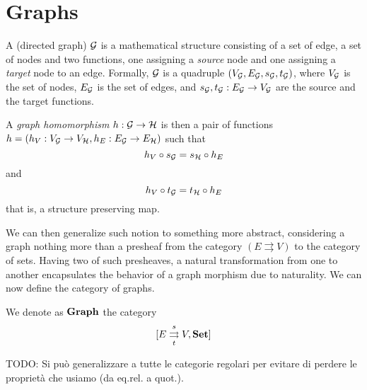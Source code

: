 \section{Graphs}\label{sect:graphs}

A (directed graph) $\mathcal{G}$ is a mathematical structure consisting of a set of edge, a set of nodes and two functions, one assigning a \emph{source} node and one assigning a \emph{target} node to an edge. Formally, $\mathcal{G}$ is a quadruple $(V_{\mathcal{G}}, E_{\mathcal{G}}, s_{\mathcal{G}}, t_{\mathcal{G}})$, where $V_{\mathcal{G}}$ is the set of nodes, $E_{\mathcal{G}}$ is the set of edges, and $s_{\mathcal{G}}, t_{\mathcal{G}}: E_{\mathcal{G}} \rightarrow V_{\mathcal{G}}$ are the source and the target functions.

A \emph{graph homomorphism} $h: \mathcal{G \rightarrow H}$ is then a pair of functions $h = (h_V: V_{\mathcal{G}} \rightarrow V_{\mathcal{H}}, h_E: E_{\mathcal{G}} \rightarrow E_{\mathcal{H}})$ such that
    \[
        h_V \circ s_{\mathcal{G}} = s_{\mathcal{H}} \circ h_E
    \]
    and
    \[
        h_V \circ t_{\mathcal{G}} = t_{\mathcal{H}} \circ h_E
    \]
that is, a structure preserving map.

We can then generalize such notion to something more abstract, considering a graph nothing more than a presheaf from the category $(E \rightrightarrows V)$ to the category of sets.
Having two of such presheaves, a natural transformation from one to another encapsulates the behavior of a graph morphism due to naturality. We can now define the category of graphs.

\begin{definition}\label{def:cat_of_graph}
    We denote as $\mathbf{Graph}$ the category $$[E \mathrel{\mathop{\rightrightarrows}^{s}_{t}} V , \mathbf{Set}]$$
\end{definition}

\begin{remark}
    TODO: Si può generalizzare a tutte le categorie regolari per evitare di perdere le proprietà che usiamo (da eq.rel. a quot.).
\end{remark}